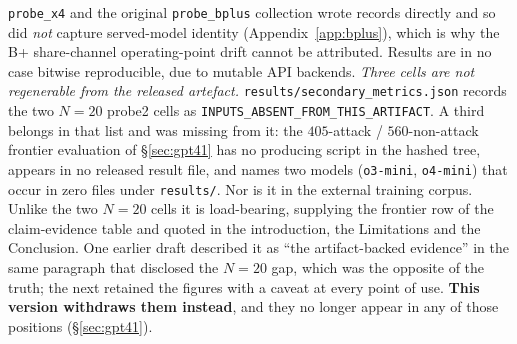 \documentclass{article}
\begin{document}
\texttt{probe\_x4} and the original \texttt{probe\_bplus} collection wrote records directly and so did \emph{not} capture served-model identity (Appendix~\ref{app:bplus}), which is why the B+ share-channel operating-point drift cannot be attributed. Results are in no case bitwise reproducible, due to mutable API backends. \emph{Three cells are not regenerable from the released artefact.} \texttt{results/secondary\_metrics.json} records the two $N{=}20$ probe2 cells as \texttt{INPUTS\_ABSENT\_FROM\_THIS\_ARTIFACT}. A third belongs in that list and was missing from it: the $405$-attack / $560$-non-attack frontier evaluation of \S\ref{sec:gpt41} has no producing script in the hashed tree, appears in no released result file, and names two models (\texttt{o3-mini}, \texttt{o4-mini}) that occur in zero files under \texttt{results/}. Nor is it in the external training corpus. Unlike the two $N{=}20$ cells it is load-bearing, supplying the frontier row of the claim-evidence table and quoted in the introduction, the Limitations and the Conclusion. One earlier draft described it as ``the artifact-backed evidence'' in the same paragraph that disclosed the $N{=}20$ gap, which was the opposite of the truth; the next retained the figures with a caveat at every point of use. \textbf{This version withdraws them instead}, and they no longer appear in any of those positions (\S\ref{sec:gpt41}).
\end{document}
